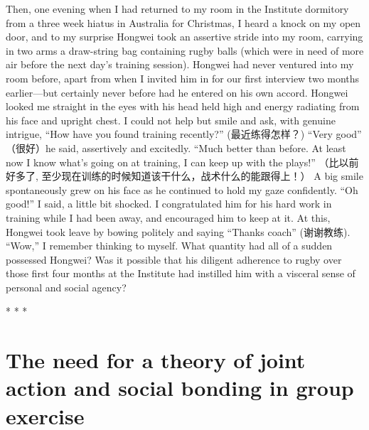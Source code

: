 \begin{CJK}{UTF8}{gbsn}
Then, one evening when I had returned to my room in the Institute dormitory from a three week hiatus in Australia for Christmas, I heard a knock on my open door, and to my surprise Hongwei took an assertive stride into my room, carrying in two arms a draw-string bag containing rugby balls (which were in need of more air before the next day's training session).  Hongwei had never ventured into my room before, apart from when I invited him in for our first interview two months earlier---but certainly never before had he entered on his own accord.  Hongwei looked me straight in the eyes with his head held high and energy radiating from his face and upright chest.  I could not help but smile and ask, with genuine intrigue, ``How have you found training recently?'' (最近练得怎样？)
``Very good'' （很好）he said, assertively and excitedly.  ``Much better than before.  At least now I know what’s going on at training, I can keep up with the plays!'' （比以前好多了, 至少现在训练的时候知道该干什么，战术什么的能跟得上！） A big smile spontaneously grew on his face as he continued to hold my gaze confidently.  ``Oh good!'' I said, a little bit shocked.  I congratulated him for his hard work in training while I had been away, and encouraged him to keep at it.  At this, Hongwei took leave by bowing politely and saying ``Thanks coach'' (谢谢教练).  ``Wow,'' I remember thinking to myself.  What quantity had all of a sudden possessed Hongwei? Was it possible that his diligent adherence to rugby over those first four months at the Institute had instilled him with a visceral sense of personal and social agency?

                          \begin{center}
                            * * *
                          \end{center}





\section{The need for a theory of joint action and social bonding in group exercise}


\end{CJK}
